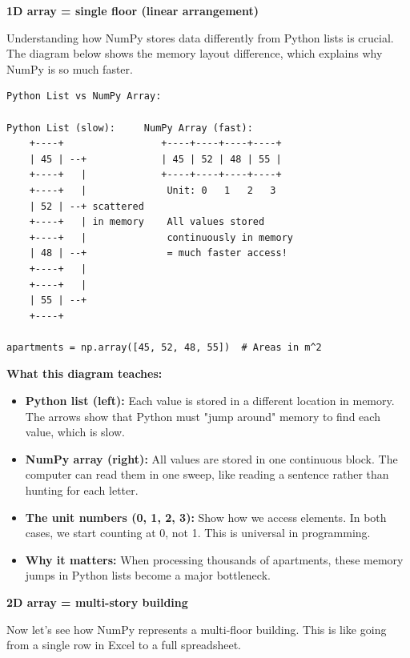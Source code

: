 \begin{tcolorbox}[
    title=Visualizing arrays as buildings,
    colframe=purple,
    colback = white,
    arc=2mm,
    breakable
]
\textbf{1D array = single floor (linear arrangement)}

Understanding how NumPy stores data differently from Python lists is crucial. The diagram below shows the memory layout difference, which explains why NumPy is so much faster.

\begin{lstlisting}[basicstyle=\ttfamily\footnotesize,breaklines=true,columns=fullflexible,keepspaces=true,xleftmargin=0pt]
Python List vs NumPy Array:

Python List (slow):     NumPy Array (fast):
    +----+                 +----+----+----+----+
    | 45 | --+             | 45 | 52 | 48 | 55 |
    +----+   |             +----+----+----+----+
    +----+   |              Unit: 0   1   2   3
    | 52 | --+ scattered    
    +----+   | in memory    All values stored
    +----+   |              continuously in memory
    | 48 | --+              = much faster access!
    +----+   |
    +----+   |
    | 55 | --+
    +----+

apartments = np.array([45, 52, 48, 55])  # Areas in m^2
\end{lstlisting}

\textbf{What this diagram teaches:}
\begin{itemize}
\item \textbf{Python list (left):} Each value is stored in a different location in memory. The arrows show that Python must "jump around" memory to find each value, which is slow.
\item \textbf{NumPy array (right):} All values are stored in one continuous block. The computer can read them in one sweep, like reading a sentence rather than hunting for each letter.
\item \textbf{The unit numbers (0, 1, 2, 3):} Show how we access elements. In both cases, we start counting at 0, not 1. This is universal in programming.
\item \textbf{Why it matters:} When processing thousands of apartments, these memory jumps in Python lists become a major bottleneck.
\end{itemize}
\vspace{2em}

\textbf{2D array = multi-story building}

Now let's see how NumPy represents a multi-floor building. This is like going from a single row in Excel to a full spreadsheet.


\end{tcolorbox}
